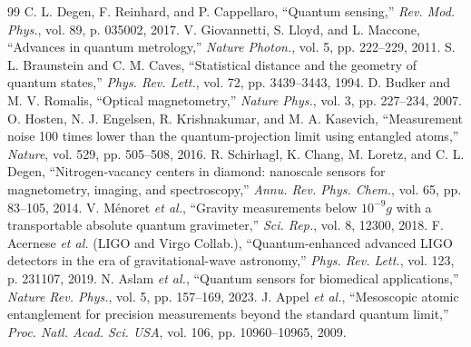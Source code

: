 \documentclass[12pt]{article}
\begin{document}
\begin{thebibliography}{99}
 C. L. Degen, F. Reinhard, and P. Cappellaro, “Quantum sensing,” \textit{Rev. Mod. Phys.}, vol. 89, p. 035002, 2017.
 V. Giovannetti, S. Lloyd, and L. Maccone, “Advances in quantum metrology,” \textit{Nature Photon.}, vol. 5, pp. 222–229, 2011.
 S. L. Braunstein and C. M. Caves, “Statistical distance and the geometry of quantum states,” \textit{Phys. Rev. Lett.}, vol. 72, pp. 3439–3443, 1994.
 D. Budker and M. V. Romalis, “Optical magnetometry,” \textit{Nature Phys.}, vol. 3, pp. 227–234, 2007.
 O. Hosten, N. J. Engelsen, R. Krishnakumar, and M. A. Kasevich, “Measurement noise 100 times lower than the quantum-projection limit using entangled atoms,” \textit{Nature}, vol. 529, pp. 505–508, 2016.
 R. Schirhagl, K. Chang, M. Loretz, and C. L. Degen, “Nitrogen-vacancy centers in diamond: nanoscale sensors for magnetometry, imaging, and spectroscopy,” \textit{Annu. Rev. Phys. Chem.}, vol. 65, pp. 83–105, 2014.
 V. Ménoret \textit{et al.}, “Gravity measurements below $10^{-9} g$ with a transportable absolute quantum gravimeter,” \textit{Sci. Rep.}, vol. 8, 12300, 2018.
 F. Acernese \textit{et al.} (LIGO and Virgo Collab.), “Quantum-enhanced advanced LIGO detectors in the era of gravitational-wave astronomy,” \textit{Phys. Rev. Lett.}, vol. 123, p. 231107, 2019.
 N. Aslam \textit{et al.}, “Quantum sensors for biomedical applications,” \textit{Nature Rev. Phys.}, vol. 5, pp. 157–169, 2023.
 J. Appel \textit{et al.}, “Mesoscopic atomic entanglement for precision measurements beyond the standard quantum limit,” \textit{Proc. Natl. Acad. Sci. USA}, vol. 106, pp. 10960–10965, 2009.
\end{thebibliography}
 
\end{document}
